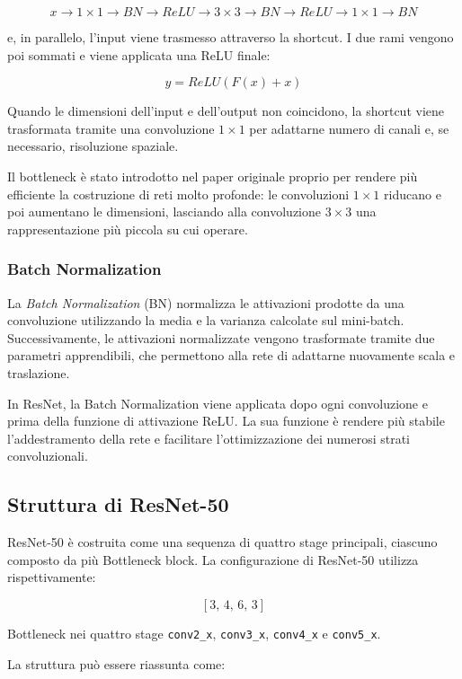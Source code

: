 \[
x
\rightarrow
1\times1
\rightarrow
BN
\rightarrow
ReLU
\rightarrow
3\times3
\rightarrow
BN
\rightarrow
ReLU
\rightarrow
1\times1
\rightarrow
BN
\]

e, in parallelo, l'input viene trasmesso attraverso la shortcut. I due rami vengono
poi sommati e viene applicata una ReLU finale:

\[
y = ReLU(F(x) + x)
\]

Quando le dimensioni dell'input e dell'output non coincidono, la shortcut viene
trasformata tramite una convoluzione $1\times1$ per adattarne numero di canali e,
se necessario, risoluzione spaziale.

Il bottleneck è stato introdotto nel paper originale proprio per rendere più
efficiente la costruzione di reti molto profonde: le convoluzioni $1\times1$
riducano e poi aumentano le dimensioni, lasciando alla convoluzione $3\times3$ una
rappresentazione più piccola su cui operare. 

\subsubsection{Batch Normalization}

La \textit{Batch Normalization} (BN) normalizza le attivazioni prodotte da una
convoluzione utilizzando la media e la varianza calcolate sul mini-batch. 
Successivamente, le attivazioni normalizzate vengono trasformate tramite due
parametri apprendibili, che permettono alla rete di adattarne nuovamente scala e
traslazione.

In ResNet, la Batch Normalization viene applicata dopo ogni convoluzione e prima
della funzione di attivazione ReLU. La sua funzione è rendere più stabile
l'addestramento della rete e facilitare l'ottimizzazione dei numerosi strati
convoluzionali.


\subsection{Struttura di ResNet-50}

ResNet-50 è costruita come una sequenza di quattro stage principali, ciascuno
composto da più Bottleneck block. La configurazione di ResNet-50 utilizza
rispettivamente:

\[
[3,\,4,\,6,\,3]
\]

Bottleneck nei quattro stage \texttt{conv2\_x}, \texttt{conv3\_x},
\texttt{conv4\_x} e \texttt{conv5\_x}.

La struttura può essere riassunta come:

